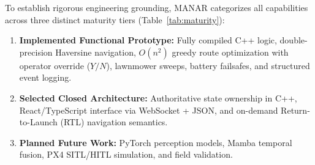 \documentclass[conference]{IEEEtran}
\begin{document}
To establish rigorous engineering grounding, MANAR categorizes all capabilities across three distinct maturity tiers (Table~\ref{tab:maturity}):
\begin{enumerate}
    \item \textbf{Implemented Functional Prototype:} Fully compiled C++ logic, double-precision Haversine navigation, $O(n^2)$ greedy route optimization with operator override ($Y/N$), lawnmower sweeps, battery failsafes, and structured event logging.
    \item \textbf{Selected Closed Architecture:} Authoritative state ownership in C++, React/TypeScript interface via WebSocket + JSON, and on-demand Return-to-Launch (RTL) navigation semantics.
    \item \textbf{Planned Future Work:} PyTorch perception models, Mamba temporal fusion, PX4 SITL/HITL simulation, and field validation.
\end{enumerate}
\end{document}
